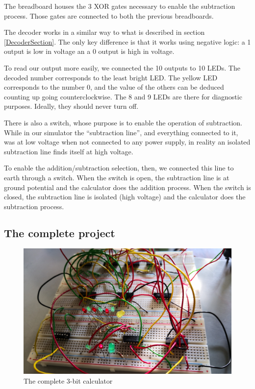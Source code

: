 \documentclass{article}
\begin{document}
The breadboard houses the 3 XOR gates necessary to enable the subtraction process. Those gates are connected to both the previous breadboards.

\vspace{3mm}

The decoder works in a similar way to what is described in section \ref{DecoderSection}. The only key difference is that it works using negative logic: a 1 output is low in voltage an a 0 output is high in voltage. 

\vspace{3mm}

To read our output more easily, we connected the 10 outputs to 10 LEDs. The decoded number corresponds to the least bright LED. The yellow LED corresponds to the number 0, and the value of the others can be deduced counting up going counterclockwise. The 8 and 9 LEDs are there for diagnostic purposes. Ideally, they should never turn off.

\vspace{3mm}

There is also a switch, whose purpose is to enable the operation of subtraction. While in our simulator the ``subtraction line'', and everything connected to it, was at low voltage when not connected to any power supply, in reality an isolated subtraction line finds itself at high voltage. 

\vspace{3mm}

To enable the addition/subtraction selection, then, we connected this line to earth through a switch. When the switch is open, the subtraction line is at ground potential and the calculator does the addition process. When the switch is closed, the subtraction line is isolated (high voltage) and the calculator does the subtraction process.

\clearpage

\subsection{The complete project}

\begin{figure}[h]
  \centering
  \includegraphics[width=\linewidth]{calculator}
  \caption{The complete 3-bit calculator}
  \label{calculator}
\end{figure}
\end{document}
